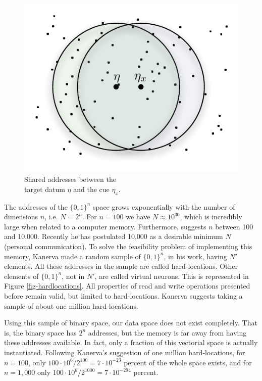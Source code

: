 \begin{figure}[h]
\centering\includegraphics[scale=0.75]{./images02/p1_inter_p2.pdf}

\caption{Shared addresses between the \protect \\
target datum $\eta$ and the cue $\eta_{x}$. \label{fig-shared-addresses}}
\end{figure}


The addresses of the $\{0,1\}^{n}$ space grows exponentially with the number of dimensions $n$, i.e. $N=2^{n}$. For $n=100$ we have $N\approx10^{30}$, which is incredibly large when related to a computer memory. Furthermore, \citet{Kanerva1988} suggests $n$ between 100 and 10,000. Recently he has postulated 10,000 as a desirable minimum $N$ (personal communication). To solve the feasibility problem of implementing this memory, Kanerva made a random sample of $\{0,1\}^{n}$, in his work, having $N'$ elements. All these addresses in the sample are called hard-locations. Other elements of $\{0,1\}^{n}$, not in $N'$, are called virtual neurons. This is represented in Figure \ref{fig-hardlocations}.  All properties of read and write operations presented before remain valid, but limited to hard-locations. Kanerva suggests taking a sample of about one million hard-locations.

Using this sample of binary space, our data space does not exist completely.  That is, the binary space has $2^{n}$ addresses, but the memory is far away from having these addresses available. In fact, only a fraction of this vectorial space is actually instantiated. Following Kanerva's suggestion of one million hard-locations, for $n=100$, only $100\cdot10^{6}/2^{100}=7\cdot10^{-23}$ percent of the whole space exists, and for $n=1,000$ only $100\cdot10^{6}/2^{1000}=7\cdot10^{-294}$ percent.

